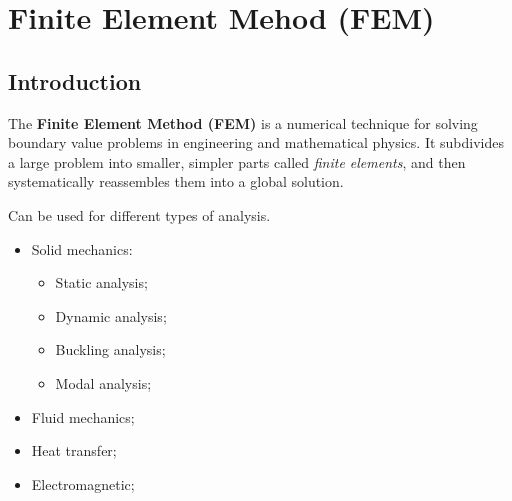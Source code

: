 \chapter{Finite Element Mehod (FEM)}

\section{Introduction}
The \textbf{Finite Element Method (FEM)} is a numerical technique for solving boundary value problems in engineering and mathematical physics. It subdivides a large problem into smaller, simpler parts called \textit{finite elements}, and then systematically reassembles them into a global solution.

Can be used for different types of analysis.
\begin{itemize}
\item Solid mechanics:
\begin{itemize}
  \item Static analysis;
  \item Dynamic analysis;
  \item Buckling analysis;
  \item Modal analysis;
\end{itemize}
\item Fluid mechanics;
\item Heat transfer;
\item Electromagnetic;
\end{itemize}



